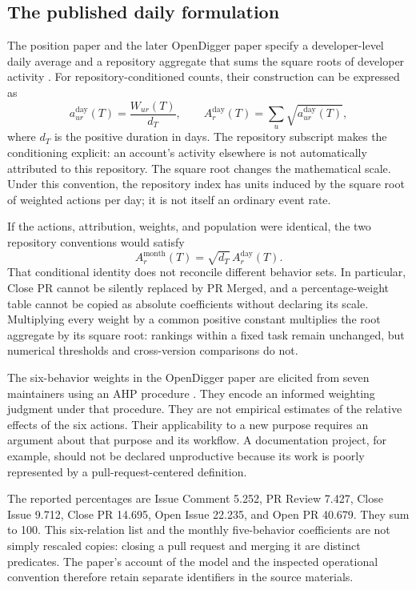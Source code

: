 

\subsection{The published daily formulation}
The position paper and the later OpenDigger paper specify a developer-level daily average and a repository aggregate that sums the square roots of developer activity \citep{han2024ose,wang2026digger}. For repository-conditioned counts, their construction can be expressed as
\begin{equation}
a_{ur}^{\mathrm{day}}(T)=\frac{W_{ur}(T)}{d_T},
\qquad
A_r^{\mathrm{day}}(T)=\sum_u\sqrt{a_{ur}^{\mathrm{day}}(T)},
\label{eq:ch4-paper-activity}
\end{equation}
where \(d_T\) is the positive duration in days. The repository subscript makes the conditioning explicit: an account's activity elsewhere is not automatically attributed to this repository. The square root changes the mathematical scale. Under this convention, the repository index has units induced by the square root of weighted actions per day; it is not itself an ordinary event rate.

If the actions, attribution, weights, and population were identical, the two repository conventions would satisfy
\[
A_r^{\mathrm{month}}(T)=\sqrt{d_T}\,A_r^{\mathrm{day}}(T).
\]
That conditional identity does not reconcile different behavior sets. In particular, Close PR cannot be silently replaced by PR Merged, and a percentage-weight table cannot be copied as absolute coefficients without declaring its scale. Multiplying every weight by a common positive constant multiplies the root aggregate by its square root: rankings within a fixed task remain unchanged, but numerical thresholds and cross-version comparisons do not.

The six-behavior weights in the OpenDigger paper are elicited from seven maintainers using an AHP procedure \citep[Appendix A.4 and Table 7]{wang2026digger}. They encode an informed weighting judgment under that procedure. They are not empirical estimates of the relative effects of the six actions. Their applicability to a new purpose requires an argument about that purpose and its workflow. A documentation project, for example, should not be declared unproductive because its work is poorly represented by a pull-request-centered definition.


The reported percentages are Issue Comment 5.252, PR Review 7.427, Close Issue 9.712, Close PR 14.695, Open Issue 22.235, and Open PR 40.679. They sum to 100. This six-relation list and the monthly five-behavior coefficients are not simply rescaled copies: closing a pull request and merging it are distinct predicates. The paper's account of the model and the inspected operational convention therefore retain separate identifiers in the source materials.


